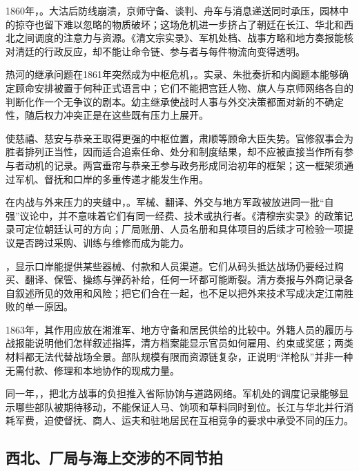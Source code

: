 1860年，。大沽后防线崩溃，京师守备、谈判、舟车与消息递送同时承压，园林中的掠夺也留下难以忽略的物质破坏；这场危机进一步挤占了朝廷在长江、华北和西北之间调度的注意力与资源。《清文宗实录》、军机处档、战事方略和地方奏报能核对清廷的行政反应，却不能让命令链、参与者与每件物流向变得透明。

热河的继承问题在1861年突然成为中枢危机，。实录、朱批奏折和内阁题本能够确定顾命安排被置于何种正式语言中；它们不能把宫廷人物、旗人与京师网络各自的判断化作一个无争议的剧本。幼主继承使战时人事与外交决策都面对新的不确定性，随后权力冲突正是在这些既有压力上展开。

使慈禧、慈安与恭亲王取得更强的中枢位置，肃顺等顾命大臣失势。官修叙事会为胜者排列正当性，因而适合追索任命、处分和制度结果，却不应被直接当作所有参与者动机的记录。两宫垂帘与恭亲王参与政务形成同治初年的框架；这一框架须通过军机、督抚和口岸的多重传递才能发生作用。

在内战与外来压力的夹缝中，。军械、翻译、外交与地方军政被放进同一批“自强”议论中，并不意味着它们有同一经费、技术或执行者。《清穆宗实录》的政策记录可定位朝廷认可的方向；厂局账册、人员名册和具体项目的后续才可检验一项提议是否跨过采购、训练与维修而成为能力。

，显示口岸能提供某些器械、付款和人员渠道。它们从码头抵达战场仍要经过购买、翻译、保管、操练与弹药补给，任何一环都可能断裂。清方奏报与外商记录各自叙述所见的效用和风险；把它们合在一起，也不足以把外来技术写成决定江南胜败的单一原因。

1863年，其作用应放在湘淮军、地方守备和居民供给的比较中。外籍人员的履历与战报能说明他们怎样叙述指挥，清方档案能显示官员如何雇用、约束或奖惩；两类材料都无法代替战场全景。部队规模有限而资源链复杂，正说明“洋枪队”并非一种无需付款、修理和本地协作的现成力量。

同一年，，把北方战事的负担推入省际协饷与道路网络。军机处的调度记录能够显示哪些部队被期待移动，不能保证人马、饷项和草料同时到位。长江与华北并行消耗军费，迫使督抚、商人、运夫和驻地居民在互相竞争的要求中承受不同的压力。

\subsection{西北、厂局与海上交涉的不同节拍}

